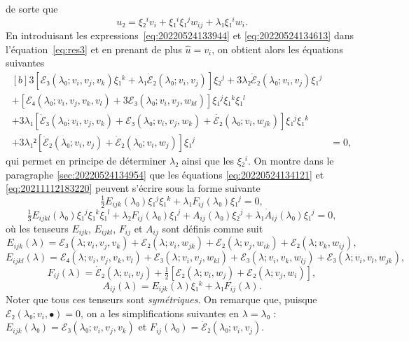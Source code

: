 \documentclass[12pt, final]{scrartcl}
\theoremstyle{definition}
\begin{document}
de sorte que
\begin{equation}
  \label{eq:20220524134613}
  u₂ = ξ₂^i v_i + ξ₁^i ξ₁^j w_{ij} + λ₁ ξ₁^i w_i .
\end{equation}
En introduisant les expressions~\eqref{eq:20220524133944} et
\eqref{eq:20220524134613} dans l'équation~\eqref{eq:res3} et en prenant de plus
\(\hat{u} = v_i\), on obtient alors les équations suivantes
\begin{equation}
  \label{eq:20211112183220}
  \begin{aligned}[b]
    3[ℰ₃(λ₀; v_i, v_j, v_k) ξ₁^k + λ₁ \dot{ℰ}₂(λ₀; v_i, v_j)] ξ₂^j + 3λ₂ \dot{ℰ}₂(λ₀; v_i, v_j) ξ₁^j &\\
    + [ℰ₄(λ₀; v_i, v_j, v_k, v_l) + 3ℰ₃(λ₀; v_i, v_j, w_{kl})] ξ₁^j ξ₁^k ξ₁^l &\\
    + 3λ₁ [\dot{ℰ}₃(λ₀; v_i, v_j, v_k) + ℰ₃(λ₀; v_i, v_j, w_k) + \dot{ℰ₂}(λ₀; v_i, w_{jk})] ξ₁^j ξ₁^k&\\
    + 3λ₁² [\ddot{ℰ}₂(λ₀; v_i, v_j) + \dot{ℰ}₂(λ₀ ; v_i, w_j)] ξ₁^j &= 0,
  \end{aligned}
\end{equation}
qui permet en principe de déterminer \(λ₂\) ainsi que les \(ξ₂^i\). On montre
dans le paragraphe \ref{sec:20220524134954} que les équations
\eqref{eq:20220524134121} et \eqref{eq:20211112183220} peuvent s'écrire sous la
forme suivante
\begin{equation}
  \label{eq:20220524135036}
  \tfrac{1}{2} E_{ijk}(λ₀) ξ₁^j ξ₁^k + λ₁ F_{ij}(λ₀) ξ₁^j = 0,
\end{equation}
\begin{equation}
  \label{eq:20220601070917}
  \tfrac{1}{3} E_{ijkl}(λ₀) ξ₁^j ξ₁^k ξ₁^l + λ₂ F_{ij}(λ₀) ξ₁^j + A_{ij}(λ₀) ξ₂^j + λ₁ \dot{A}_{ij}(λ₀) ξ₁^j = 0,
\end{equation}
où les tenseurs \(E_{i j k}\), \(E_{i j k l}\), \(F_{i j}\) et \(A_{i j}\) sont
définis comme suit 
\begin{equation}
  \label{eq:20220524135619}
  E_{ijk}(λ) = ℰ₃(λ; v_i, v_j, v_k) + ℰ₂(λ; v_i, w_{jk}) + ℰ₂(λ; v_j, w_{ik}) + ℰ₂(λ ; v_k, w_{ij}),
\end{equation}
\begin{equation}
  \label{eq:20220524135553}
  E_{i j k l}(λ) = ℰ₄(λ ; v_i, v_j, v_k, v_l) + ℰ₃(λ ; v_i, v_j, w_{k l}) + ℰ₃(λ ; v_i, v_k, w_{l j}) + ℰ₃(λ ; v_i, v_l, w_{j k}),
\end{equation}
\begin{equation}
  \label{eq:20220524135643}
  F_{ij}(λ) = \dot{ℰ}₂(λ; v_i, v_j) + \tfrac{1}{2} [ℰ₂(λ; v_i, w_j) + ℰ₂(λ; v_j, w_i)],
\end{equation}
\begin{equation}
  \label{eq:20220524135705}
  A_{ij}(λ) = E_{ijk}(λ) ξ₁^k + λ₁ F_{ij}(λ) .
\end{equation}
Noter que tous ces tenseurs sont \emph{symétriques}. On remarque que, puisque
\(ℰ₂(λ₀ ; v_i, •) = 0\), on a les simplifications suivantes en \(λ = λ₀\) :
\(E_{ijk}(λ₀) = ℰ₃(λ₀; v_i, v_j, v_k)\) et
\(F_{ij}(λ₀) = \dot{ℰ}₂(λ₀; v_i, v_j)\).
\end{document}
